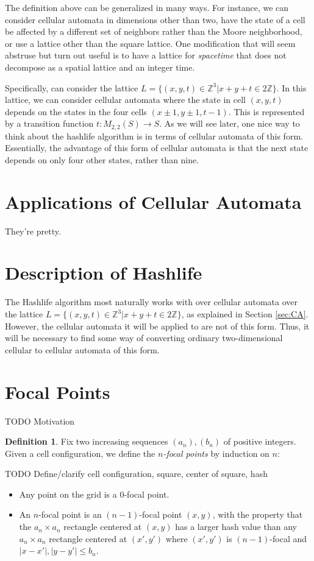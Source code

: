 \documentclass{article}
\theoremstyle{definition}
\newtheorem{definition}{Definition}
\begin{document}
The definition above can be generalized in many ways. For instance, we can
consider cellular automata in dimensions other than two, have the state of a
cell be affected by a different set of neighbors rather than the Moore
neighborhood, or use a lattice other than the square lattice. One modification
that will seem abstruse but turn out useful is to have a lattice for \emph
{spacetime} that does not decompose as a spatial lattice and an integer time.

Specifically, can consider the lattice $L = \{(x, y, t) \in \mathbb {Z}^3 | x +
y + t \in 2 \mathbb {Z}\}$. In this lattice, we can consider cellular automata
where the state in cell $(x, y, t)$ depends on the states in the four cells $(x
\pm 1, y \pm 1, t-1)$. This is represented by a transition function $t : M_{2,2}
(S) \to S$. As we will see later, one nice way to think about the hashlife
algorithm is in terms of cellular automata of this form. Essentially, the
advantage of this form of cellular automata is that the next state depends on
only four other states, rather than nine.

\section{Applications of Cellular Automata}

They're pretty.

\section{Description of Hashlife}

The Hashlife algorithm most naturally works with over cellular automata over the
lattice $L = \{(x, y, t) \in \mathbb {Z}^3 | x + y + t \in 2 \mathbb {Z}\}$, as
explained in Section \ref{sec:CA}. However, the cellular automata it will be
applied to are not of this form. Thus, it will be necessary to find some way of
converting ordinary two-dimensional cellular to cellular automata of this form.

\section{Focal Points}

TODO Motivation

\begin{definition}
Fix two increasing sequences $(a_n), (b_n)$ of positive integers. Given a cell
configuration, we define the \emph{$n$-focal points} by induction on $n$:

TODO Define/clarify cell configuration, square, center of square, hash

\begin{itemize}
\item Any point on the grid is a $0$-focal point.
\item An $n$-focal point is an $(n-1)$-focal point $(x, y)$, with the property
that the $a_n \times a_n$ rectangle centered at $(x, y)$ has a larger hash value
than any $a_n \times a_n$ rectangle centered at $(x', y')$ where $(x', y')$ is
$(n-1)$-focal and $|x - x'|, |y - y'| \leq b_n$.
\end{itemize}
\end{definition}
\end{document}
